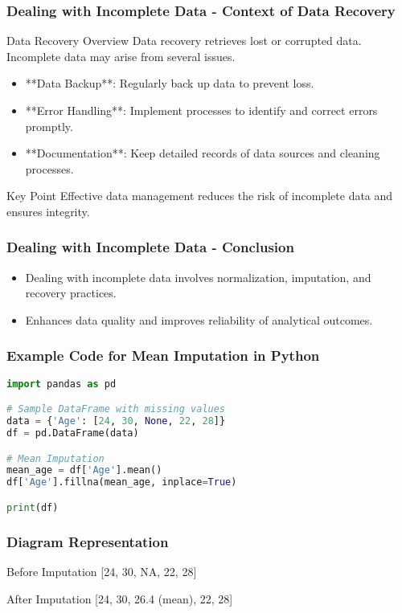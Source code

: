 \documentclass[aspectratio=169]{beamer}
\begin{document}
\begin{frame}[fragile]
    \frametitle{Dealing with Incomplete Data - Context of Data Recovery}
    \begin{block}{Data Recovery Overview}
        Data recovery retrieves lost or corrupted data. Incomplete data may arise from several issues.
    \end{block}
    \begin{itemize}
        \item **Data Backup**: Regularly back up data to prevent loss.
        \item **Error Handling**: Implement processes to identify and correct errors promptly.
        \item **Documentation**: Keep detailed records of data sources and cleaning processes.
    \end{itemize}
    \begin{block}{Key Point}
        Effective data management reduces the risk of incomplete data and ensures integrity.
    \end{block}
\end{frame}

\begin{frame}[fragile]
    \frametitle{Dealing with Incomplete Data - Conclusion}
    \begin{itemize}
        \item Dealing with incomplete data involves normalization, imputation, and recovery practices.
        \item Enhances data quality and improves reliability of analytical outcomes.
    \end{itemize}
\end{frame}

\begin{frame}[fragile]
    \frametitle{Example Code for Mean Imputation in Python}
    \begin{lstlisting}[language=Python]
import pandas as pd

# Sample DataFrame with missing values
data = {'Age': [24, 30, None, 22, 28]}
df = pd.DataFrame(data)

# Mean Imputation
mean_age = df['Age'].mean()
df['Age'].fillna(mean_age, inplace=True)

print(df)
    \end{lstlisting}
\end{frame}

\begin{frame}[fragile]
    \frametitle{Diagram Representation}
    \begin{block}{Before Imputation}
        [24, 30, NA, 22, 28]
    \end{block}
    \begin{block}{After Imputation}
        [24, 30, 26.4 (mean), 22, 28]
    \end{block}
\end{frame}
\end{document}
